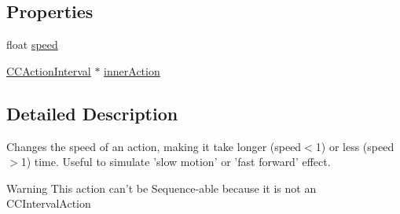 \subsection*{Properties}
\begin{DoxyCompactItemize}
\item 
float \hyperlink{interface_c_c_speed_a346e8637e932398e07aba868ef7b11d6}{speed}
\item 
\hyperlink{class_c_c_action_interval}{C\-C\-Action\-Interval} $\ast$ \hyperlink{interface_c_c_speed_a79868e5ba88157593769820e5a3a610d}{inner\-Action}
\end{DoxyCompactItemize}


\subsection{Detailed Description}
Changes the speed of an action, making it take longer (speed$<$1) or less (speed$>$1) time. Useful to simulate 'slow motion' or 'fast forward' effect. \begin{DoxyWarning}{Warning}
This action can't be Sequence-\/able because it is not an C\-C\-Interval\-Action 
\end{DoxyWarning}


